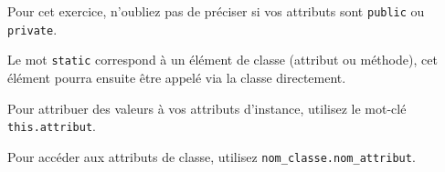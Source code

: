 \begin{Exercice}[10 minutes]
\begin{conseil}
   Pour cet exercice, n'oubliez pas de préciser si vos attributs sont \lstinline{public} ou \lstinline{private}.
   
   Le mot \lstinline{static} correspond à un élément de classe (attribut ou méthode), cet élément pourra ensuite être appelé via la classe directement.
   
   Pour attribuer des valeurs à vos attributs d'instance, utilisez le mot-clé \lstinline{this.attribut}.
   
   Pour accéder aux attributs de classe, utilisez \lstinline{nom_classe.nom_attribut}.
\end{conseil}
    
\begin{solution}
	
\end{solution}
\end{Exercice}

